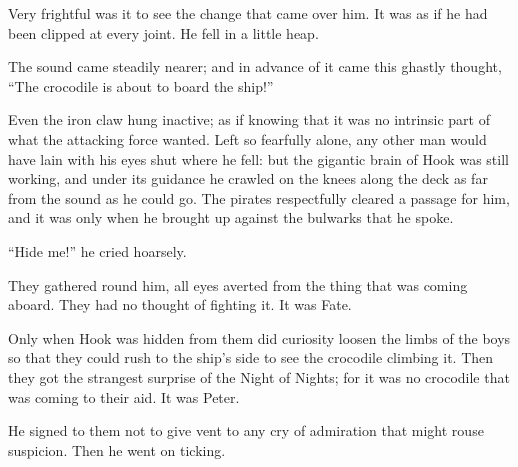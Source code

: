 Very frightful was it to see the change that came over him. It was as
if he had been clipped at every joint. He fell in a little heap.

The sound came steadily nearer; and in advance of it came this ghastly
thought, ``The crocodile is about to board the ship!''

Even the iron claw hung inactive; as if knowing that it was no
intrinsic part of what the attacking force wanted. Left so fearfully
alone, any other man would have lain with his eyes shut where he fell:
but the gigantic brain of Hook was still working, and under its
guidance he crawled on the knees along the deck as far from the sound
as he could go. The pirates respectfully cleared a passage for him, and
it was only when he brought up against the bulwarks that he spoke.

``Hide me!'' he cried hoarsely.

They gathered round him, all eyes averted from the thing that was
coming aboard. They had no thought of fighting it. It was Fate.

Only when Hook was hidden from them did curiosity loosen the limbs of
the boys so that they could rush to the ship's side to see the
crocodile climbing it. Then they got the strangest surprise of the
Night of Nights; for it was no crocodile that was coming to their aid.
It was Peter.

He signed to them not to give vent to any cry of admiration that might
rouse suspicion. Then he went on ticking.